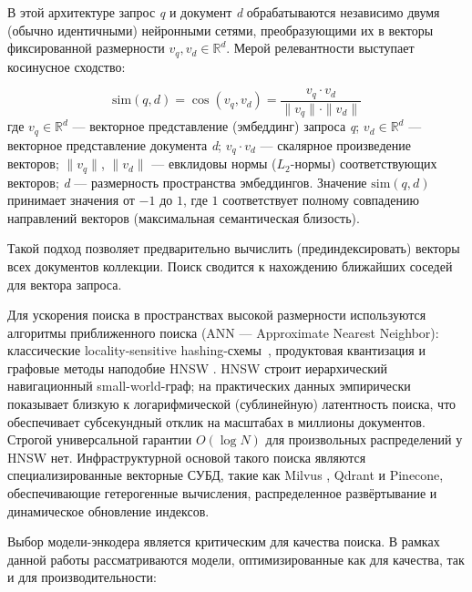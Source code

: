\documentclass[a4paper, 12pt, oneside, openany]{article}
\begin{document}
В этой архитектуре запрос \emph{q} и документ \emph{d} обрабатываются независимо двумя (обычно идентичными) нейронными сетями, преобразующими их в векторы фиксированной размерности $v_{q}, v_{d} \in \mathbb{R}^{d}$. Мерой релевантности выступает косинусное сходство:

\begin{equation}
	\mathrm{sim}(q,d) = \cos\!\left( v_{q}, v_{d} \right) = \frac{v_{q} \cdot v_{d}}{\| v_{q} \| \cdot \| v_{d} \|}
	\label{eq:1-4}
\end{equation}
где \(v_{q} \in \mathbb{R}^{d}\) --- векторное представление (эмбеддинг) запроса \emph{q}; \(v_{d} \in \mathbb{R}^{d}\) --- векторное представление документа \emph{d}; \(v_{q} \cdot v_{d}\) --- скалярное произведение векторов; \(\|v_{q}\|\), \(\|v_{d}\|\) --- евклидовы нормы ($L_2$-нормы) соответствующих векторов; \emph{d} --- размерность пространства эмбеддингов. Значение \(\mathrm{sim}(q, d)\) принимает значения от $-1$ до $1$, где $1$ соответствует полному совпадению направлений векторов (максимальная семантическая близость).

Такой подход позволяет предварительно вычислить (прединдексировать) векторы всех документов коллекции. Поиск сводится к нахождению ближайших соседей для вектора запроса.

Для ускорения поиска в пространствах высокой размерности используются алгоритмы приближенного поиска (ANN --- Approximate Nearest Neighbor): классические locality-sensitive hashing-схемы~\cite{ref57}, продуктовая квантизация \cite{ref58} и графовые методы наподобие HNSW \cite{ref18}. HNSW строит иерархический навигационный small-world-граф; на практических данных эмпирически показывает близкую к логарифмической (сублинейную) латентность поиска, что обеспечивает субсекундный отклик на масштабах в миллионы документов. Строгой универсальной гарантии $O(\log N)$ для произвольных распределений у HNSW нет. Инфраструктурной основой такого поиска являются специализированные векторные СУБД, такие как Milvus \cite{ref33}, Qdrant и Pinecone, обеспечивающие гетерогенные вычисления, распределенное развёртывание и динамическое обновление индексов.

Выбор модели-энкодера является критическим для качества поиска. В рамках данной работы рассматриваются модели, оптимизированные как для качества, так и для производительности:
\end{document}
